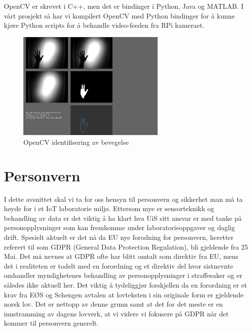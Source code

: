 \documentclass{article}
\begin{document}
OpenCV er skrevet i C++, men det er bindinger i Python, Java og MATLAB. I vårt prosjekt så har vi kompilert OpenCV med Python bindinger for å kunne kjøre Python scripts for å behandle video-feeden fra RPi kameraet.


\begin{figure}[!ht]
  \centering
      \includegraphics[width=0.65\textwidth]{OfxOpenCV}
  \caption {OpenCV identifisering av bevegelse}
\end{figure}



\newpage
\section{Personvern}
I dette avsnittet skal vi ta for oss hensyn til personvern og sikkerhet man må ta høyde for i et IoT laboratorie miljø. Ettersom mye er sensorteknikk og behandling av data er det viktig å ha klart hva UiS sitt ansvar er med tanke på personopplysninger som kan fremkomme under laboratorieoppgaver og daglig drift. Spesielt aktuelt er det nå da EU nye forodning for personvern, heretter referert til som GDPR (General Data Protection Regulation), bli gjeldende fra 25 Mai. Det må nevnes at GDPR ofte har blitt omtalt som direktiv fra EU, mens det i realiteten er todelt med en forordning og et direktiv del hvor sistnevnte omhandler myndighetenes behandling av personopplysninger i straffesaker og er således ikke aktuell her. Det viktig å tydeliggjør forskjellen da en forordning er et krav fra EØS og Schengen avtalen at lovteksten i sin originale form er gjeldende norsk lov. Det er nettopp av denne grunn samt at det for det meste er en innstramming av dagens lovverk, at vi videre vi fokusere på GDPR når det kommer til personvern generelt.
\end{document}

